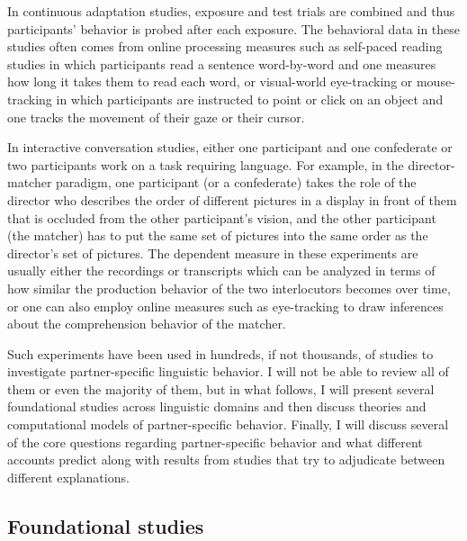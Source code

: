 In continuous adaptation studies, exposure and test trials are combined and thus participants' behavior is probed after each exposure. The behavioral data in these studies often comes from online processing measures such as self-paced reading studies in which participants read a sentence word-by-word and one measures how long it takes them to read each word, or visual-world eye-tracking \cite{Tanenhaus} or mouse-tracking \cite{e.g., roettgerFranke} in which participants are instructed to point or click on an object and one tracks the movement of their gaze or their cursor.

In interactive conversation studies, either one participant and one confederate or two participants work on a task requiring language. For example, in the director-matcher paradigm, one participant (or a confederate) takes the role of the director who describes the order of different pictures in a display in front of them that is occluded from the other participant's vision, and the other participant (the matcher) has to put the same set of pictures into the same order 
as the director's set of pictures. The dependent measure in these experiments are usually either the recordings or transcripts which can be analyzed in terms of how similar the production behavior of the two interlocutors becomes over time, or one can also employ online measures such as eye-tracking to draw inferences about the comprehension behavior of the matcher.

Such experiments have been used in hundreds, if not thousands, of studies to investigate partner-specific linguistic behavior. I will not be able to review all of them or even the majority of them, but in what follows, I will present several foundational studies across linguistic domains and then discuss theories and computational models of partner-specific behavior. Finally, I will discuss several of the core questions regarding partner-specific behavior and what different accounts predict along with results from studies that try to adjudicate between different explanations. 

\subsection{Foundational studies}

